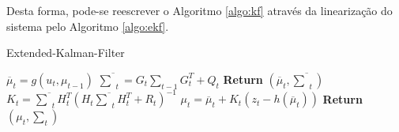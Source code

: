 Desta forma, pode-se reescrever o Algoritmo \ref{algo:kf} através da linearização do sistema pelo Algoritmo \ref{algo:ekf}.

\begin{algorithm}[H]
    \caption{Extended-Kalman-Filter}
    \begin{algorithmic}[1]
        \State $\overline{\mu}_t = g(u_t, \mu_{t-1})$
        \State $ \overline{\textstyle\sum}_t = G_t {\textstyle\sum}_{t-1} G_t^T+ Q_t$ 
        \State \textbf{Return} $\left(\overline{\mu}_t, \overline{\textstyle\sum}_t\right)$
    \EndProcedure
        \State $K_t = \overline{\textstyle\sum}_tH_t^T(H_t\overline{\textstyle\sum}_tH_t^T+R_t)^{-1}$
        \State $\mu_t  = \overline{\mu}_t + K_t(z_t -h(\overline\mu_t))$
        \State \textbf{Return} $\left(\mu_t, \textstyle\sum_t\right)$
    \EndProcedure
    \end{algorithmic}
    \label{algo:ekf}
\end{algorithm}


        
        
